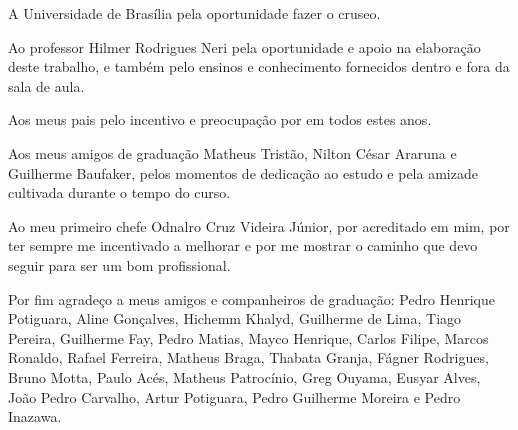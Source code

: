 \begin{agradecimentos}

A Universidade de Brasília pela oportunidade fazer o cruseo.

Ao professor Hilmer Rodrigues Neri pela oportunidade e apoio na elaboração deste trabalho, e também pelo ensinos e conhecimento fornecidos dentro e fora da sala de aula.

Aos meus pais pelo incentivo e preocupação por em todos estes anos.

Aos meus amigos de graduação Matheus Tristão, Nilton César Araruna e Guilherme Baufaker, pelos momentos de dedicação ao estudo e pela amizade cultivada durante o tempo do curso.

Ao meu primeiro chefe Odnalro Cruz Videira Júnior, por acreditado em mim, por ter sempre me incentivado a melhorar e por me mostrar o caminho que devo seguir para ser um bom profissional.

Por fim agradeço a meus amigos e companheiros de graduação: Pedro Henrique Potiguara, Aline Gonçalves, Hichemm Khalyd, Guilherme de Lima,  Tiago Pereira, Guilherme Fay, Pedro Matias, Mayco Henrique, Carlos Filipe, Marcos Ronaldo, Rafael Ferreira, Matheus Braga, Thabata Granja, Fágner Rodrigues, Bruno Motta, Paulo Acés, Matheus Patrocínio, Greg Ouyama, Eusyar Alves, João Pedro Carvalho, Artur Potiguara, Pedro Guilherme Moreira e Pedro Inazawa.


\end{agradecimentos}
